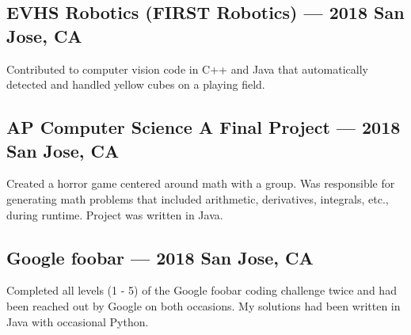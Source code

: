 \documentclass[letterpaper,12pt]{article}
\begin{document}
	\subsection{EVHS Robotics (FIRST Robotics) --- 2018 \null\hfill San Jose, CA}
	\par Contributed to computer vision code in C++ and Java that automatically detected and handled yellow cubes on a playing field.
	\subsection{AP Computer Science A Final Project --- 2018 \null\hfill San Jose, CA}
	\par Created a horror game centered around math with a group. Was responsible for generating math problems that included arithmetic, derivatives, integrals, etc., during runtime. Project was written in Java.
	\subsection{Google foobar --- 2018 \null\hfill San Jose, CA}
	\par Completed all levels (1 - 5) of the Google foobar coding challenge twice and had been reached out by Google on both occasions.
	My solutions had been written in Java with occasional Python.
\end{document}
